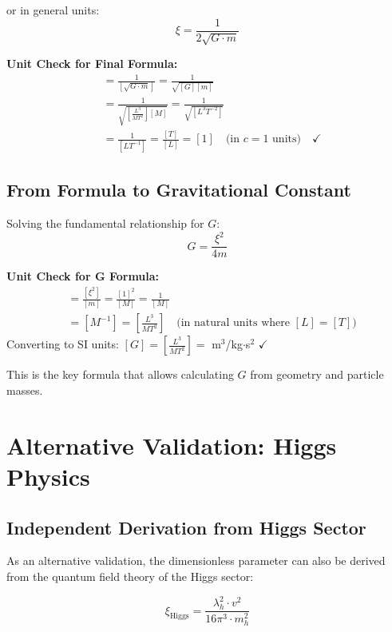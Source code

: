 \documentclass[12pt,a4paper]{article}
\theoremstyle{definition}
\begin{document}
	or in general units:
	\begin{equation}
		\boxed{\xi = \frac{1}{2\sqrt{G \cdot m}}}
	\end{equation}
	
	{\footnotesize
		\textbf{Unit Check for Final Formula:}
		\begin{align}
			[\xi] &= \frac{1}{[\sqrt{G \cdot m}]} = \frac{1}{\sqrt{[G][m]}} \\
			&= \frac{1}{\sqrt{\left[\frac{L^3}{MT^2}\right][M]}} = \frac{1}{\sqrt{[L^3T^{-2}]}} \\
			&= \frac{1}{[LT^{-1}]} = \frac{[T]}{[L]} = [1] \quad \text{(in } c=1 \text{ units)} \quad \checkmark
		\end{align}
	}
	
	\subsection{From Formula to Gravitational Constant}
	
	Solving the fundamental relationship for $G$:
	\begin{equation}
		\boxed{G = \frac{\xi^2}{4m}}
	\end{equation}
	
	{\footnotesize
		\textbf{Unit Check for G Formula:}
		\begin{align}
			[G] &= \frac{[\xi^2]}{[m]} = \frac{[1]^2}{[M]} = \frac{1}{[M]} \\
			&= [M^{-1}] = \left[\frac{L^3}{MT^2}\right] \quad \text{(in natural units where } [L]=[T] \text{)}
		\end{align}
		Converting to SI units: $[G] = \left[\frac{L^3}{MT^2}\right] = $ m$^3$/kg$\cdot$s$^2$ $\checkmark$
	}
	
	This is the key formula that allows calculating $G$ from geometry and particle masses.
	
	\section{Alternative Validation: Higgs Physics}
	
	\subsection{Independent Derivation from Higgs Sector}
	
	As an alternative validation, the dimensionless parameter can also be derived from the quantum field theory of the Higgs sector:
	
	\begin{equation}
		\xi_{\text{Higgs}} = \frac{\lambda_h^2 \cdot v^2}{16\pi^3 \cdot m_h^2}
	\end{equation}
	
\end{document}
